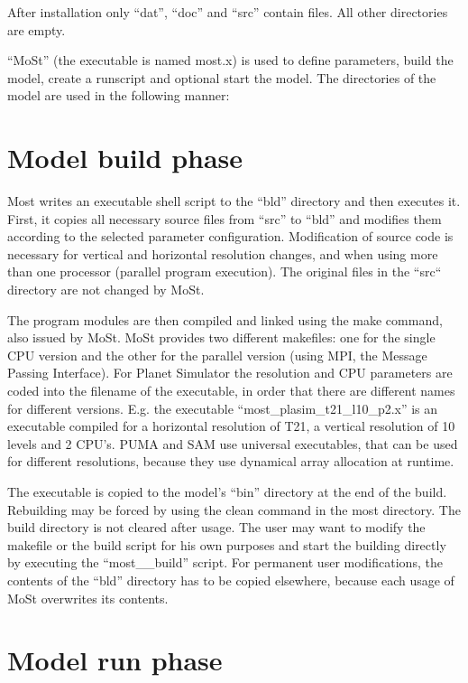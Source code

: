 After installation only ``dat'', ``doc'' and ``src'' contain files.
All other directories are empty.

``MoSt'' (the executable is named most.x) is used to define parameters,
build the model, create a runscript and optional start the model.
The directories of the model are used in the following manner:

\section{Model build phase}

Most writes an executable shell script to the ``bld'' directory
and then executes it.
First, it copies all necessary source files from ``src'' to ``bld''
and modifies
them according to the selected parameter configuration.
Modification of source code is necessary for vertical and horizontal
resolution changes, and when using more than one processor (parallel program
execution). The original files in the ``src`` directory are not changed by MoSt.

The program modules are then compiled and linked using the make command,
also issued by MoSt. MoSt provides two different makefiles:
one for the single CPU version and the other for the parallel version
(using MPI, the Message Passing Interface).
For Planet Simulator the resolution and CPU parameters are coded into the filename of the
executable, in order that there are different names for different versions.
E.g. the executable ``most\_plasim\_t21\_l10\_p2.x''
is an executable compiled for a horizontal resolution of T21,
a vertical resolution of 10 levels and 2 CPU's.
PUMA and SAM use universal executables, that can be used for different
resolutions, because they use dynamical array allocation at runtime.

The executable is copied to the model's ``bin'' directory
at the end of the build.
Rebuilding may be forced by using the {clean\modir} command
in the most directory.
The build directory is not cleared after usage. The user may want
to modify the makefile or the build script for his own purposes
and start the building directly by executing the ``most\_\modir\_build''
script.
For permanent user modifications,
the contents of the ``bld'' directory has to be copied elsewhere,
because each usage of MoSt overwrites its contents.

\section{Model run phase}

